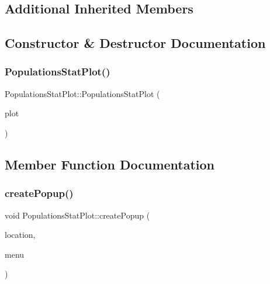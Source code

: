 \subsection*{Additional Inherited Members}


\subsection{Constructor \& Destructor Documentation}
\mbox{\label{class_populations_stat_plot_acb6333030f68073a2c38b7c848a0e79b}} 
\subsubsection{\texorpdfstring{PopulationsStatPlot()}{PopulationsStatPlot()}}
{\footnotesize\ttfamily Populations\+Stat\+Plot\+::\+Populations\+Stat\+Plot (\begin{DoxyParamCaption}\item[{\mbox{\hyperlink{class_q_custom_plot}{Q\+Custom\+Plot}} $\ast$}]{plot }\end{DoxyParamCaption})\hspace{0.3cm}{\ttfamily [explicit]}}



\subsection{Member Function Documentation}
\mbox{\label{class_populations_stat_plot_a5a42ee8a02dab2c1d004f6fc2646cca7}} 
\subsubsection{\texorpdfstring{createPopup()}{createPopup()}}
{\footnotesize\ttfamily void Populations\+Stat\+Plot\+::create\+Popup (\begin{DoxyParamCaption}\item[{\mbox{\hyperlink{class_graph_interaction_controller_a67e6eba082927bf2b984bed54fe32764}{Graph\+Interaction\+Controller\+::\+Popup\+Menu\+Location}}}]{location,  }\item[{Q\+Menu $\ast$}]{menu }\end{DoxyParamCaption})}

